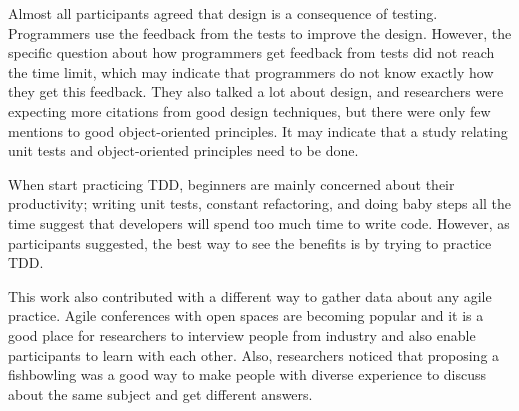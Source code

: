 Almost all participants agreed that design is a consequence of testing.
Programmers use the feedback from the tests to improve the
design. However, the specific question about how programmers get feedback from
tests did not reach the time limit, which may indicate that programmers do not
know exactly how they get this feedback.
They also talked a lot about design, and researchers were expecting
more citations from good design techniques, but there were only few
mentions to good object-oriented principles. It may indicate that a study
relating unit tests and object-oriented principles need to be done.

When start practicing TDD, beginners are mainly concerned about their
productivity; writing unit tests, constant refactoring, and doing baby steps all
the time suggest that developers will spend too much time to write code.
However, as participants suggested, the best way to see the benefits is by
trying to practice TDD.

This work also contributed with a different way to gather data about any agile
practice. Agile conferences with open spaces are becoming popular and it is a
good place for researchers to interview people from industry and also enable
participants to learn with each other. Also, researchers noticed that proposing
a fishbowling was a good way to make people with diverse experience to discuss
about the same subject and get different answers.
